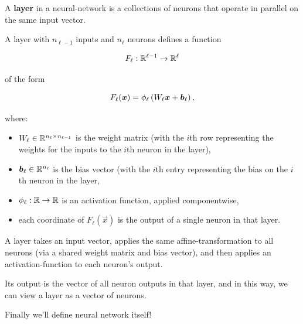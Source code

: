 \documentclass{article}
\begin{document}
\begin{definition}[Layer]
A \textbf{layer} in a \@{neural-network} is a collections of \@{neurons} that operate in parallel on the same input \@{vector}.

A layer with $n_{\ell - 1}$ inputs and $n_{\ell}$ \@{neurons} defines a \@{function}

\[ F_{\ell} : \mathbb{R}^{\ell - 1} \to \mathbb{R}^{\ell} \]

of the form

\[ F_{\ell}(\boldsymbol{x}) = \phi_{\ell} \left(W_{\ell} \boldsymbol{x} + \boldsymbol{b}_{\ell}\right), \]

where:

\begin{itemize}
\item $W_{\ell} \in \mathbb{R}^{n_{\ell} \times n_{\ell - 1}}$ is the weight matrix (with the $i$th row representing the weights for the inputs to the $i$th \@{neuron} in the layer),
\end{itemize}

\begin{itemize}
\item $\boldsymbol{b}_{\ell} \in \mathbb{R}^{n_{\ell}}$ is the bias vector (with the $i$th entry representing the bias on the $i$th \@{neuron} in the layer,
\end{itemize}

\begin{itemize}
\item $\phi_{\ell} : \mathbb{R} \to \mathbb{R} $ is an activation function, applied \@{componentwise}, 
\end{itemize}

\begin{itemize}
\item each coordinate of $F_{\ell}(\vec{x})$ is the output of a single \@{neuron} in that layer.
\end{itemize}

A layer takes an input \@{vector}, applies the same \@{affine-transformation} to all \@{neurons} (via a shared weight \@{matrix} and bias \@{vector}), and then applies an \@{activation-function} to each neuron's output.

Its output is the \@{vector} of all \@{neuron} outputs in that layer, and in this way, we can view a layer as a \@{vector} of \@{neurons}.
\end{definition}

Finally we'll define neural network itself!
\end{document}
